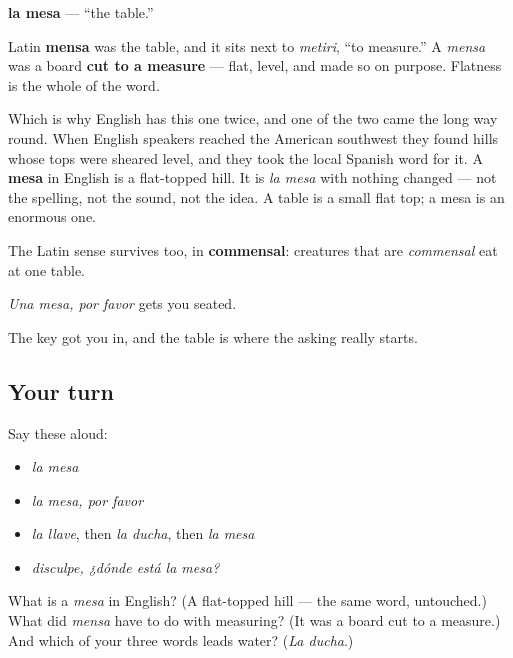 \begin{cousinweb}
\textbf{la mesa} — \textquotedblleft{}the table.\textquotedblright{}

Latin \textbf{mensa} was the table, and it sits next to \emph{metiri}, \textquotedblleft{}to measure.\textquotedblright{} A \emph{mensa} was a board \textbf{cut to a measure} — flat, level, and made so on purpose. Flatness is the whole of the word.

Which is why English has this one twice, and one of the two came the long way round. When English speakers reached the American southwest they found hills whose tops were sheared level, and they took the local Spanish word for it. A \textbf{mesa} in English is a flat-topped hill. It is \emph{la mesa} with nothing changed — not the spelling, not the sound, not the idea. A table is a small flat top; a mesa is an enormous one.

The Latin sense survives too, in \textbf{commensal}: creatures that are \emph{commensal} eat at one table.

\emph{Una mesa, por favor} gets you seated.
\end{cousinweb}

\begin{grammarlens}[title={What you've built}]
The key got you in, and the table is where the asking really starts.
\end{grammarlens}

\subsection*{Your turn}
Say these aloud:

\begin{itemize}
\raggedright
  \item \emph{la mesa}
  \item \emph{la mesa, por favor}
  \item \emph{la llave}, then \emph{la ducha}, then \emph{la mesa}
  \item \emph{disculpe, ¿dónde está la mesa?}
\end{itemize}

\begin{tcolorbox}[breakable,colback=teal!4,colframe=teal!35!black,title={Before you move on}]
What is a \emph{mesa} in English? (A flat-topped hill — the same word, untouched.) What did \emph{mensa} have to do with measuring? (It was a board cut to a measure.) And which of your three words leads water? (\emph{La ducha}.)
\end{tcolorbox}
